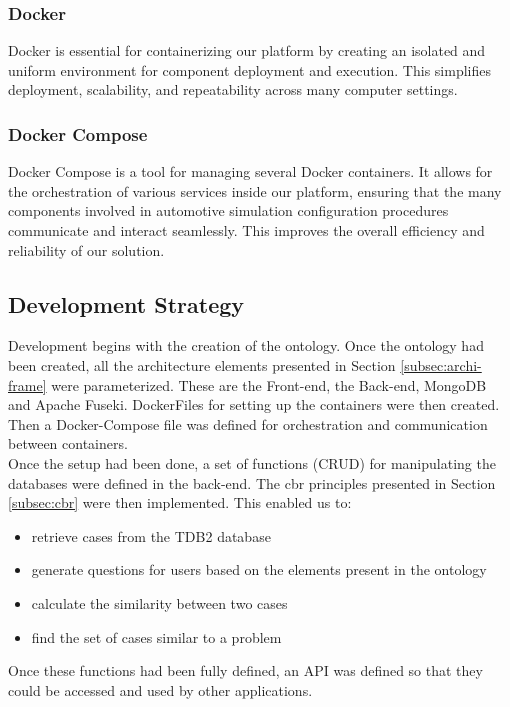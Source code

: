     \subsubsection{Docker}
    Docker is essential for containerizing our platform by creating an isolated and uniform environment for component deployment and execution. This simplifies deployment, scalability, and repeatability across many computer settings.
    
    \subsubsection{Docker Compose}
    Docker Compose is a tool for managing several Docker containers. It allows for the orchestration of various services inside our platform, ensuring that the many components involved in automotive simulation configuration procedures communicate and interact seamlessly. This improves the overall efficiency and reliability of our solution.

    
\subsection{Development Strategy}
Development begins with the creation of the ontology. Once the ontology had been created, all the architecture elements presented in Section \ref{subsec:archi-frame} were parameterized. These are the Front-end, the Back-end, MongoDB and Apache Fuseki. DockerFiles for setting up the containers were then created. Then a Docker-Compose file was defined for orchestration and communication between containers.\\

Once the setup had been done, a set of functions (CRUD) for manipulating the databases were defined in the back-end. The \acrshort{cbr} principles presented in Section \ref{subsec:cbr} were then implemented. This enabled us to:
\begin{itemize}
    \item retrieve cases from the TDB2 database
    \item generate questions for users based on the elements present in the ontology
    \item calculate the similarity between two cases
    \item find the set of cases similar to a problem
\end{itemize}

Once these functions had been fully defined, an API was defined so that they could be accessed and used by other applications.


